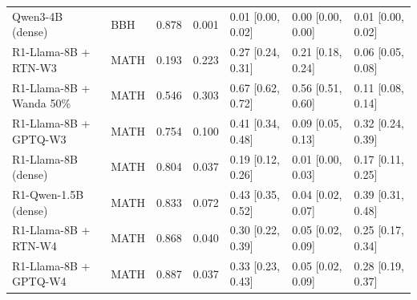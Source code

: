 \begin{tabular}{llrrlll}
Qwen3-4B (dense) & BBH & 0.878 & 0.001 & 0.01 [0.00, 0.02] & 0.00 [0.00, 0.00] & 0.01 [0.00, 0.02] \\
R1-Llama-8B + RTN-W3 & MATH & 0.193 & 0.223 & 0.27 [0.24, 0.31] & 0.21 [0.18, 0.24] & 0.06 [0.05, 0.08] \\
R1-Llama-8B + Wanda 50\% & MATH & 0.546 & 0.303 & 0.67 [0.62, 0.72] & 0.56 [0.51, 0.60] & 0.11 [0.08, 0.14] \\
R1-Llama-8B + GPTQ-W3 & MATH & 0.754 & 0.100 & 0.41 [0.34, 0.48] & 0.09 [0.05, 0.13] & 0.32 [0.24, 0.39] \\
R1-Llama-8B (dense) & MATH & 0.804 & 0.037 & 0.19 [0.12, 0.26] & 0.01 [0.00, 0.03] & 0.17 [0.11, 0.25] \\
R1-Qwen-1.5B (dense) & MATH & 0.833 & 0.072 & 0.43 [0.35, 0.52] & 0.04 [0.02, 0.07] & 0.39 [0.31, 0.48] \\
R1-Llama-8B + RTN-W4 & MATH & 0.868 & 0.040 & 0.30 [0.22, 0.39] & 0.05 [0.02, 0.09] & 0.25 [0.17, 0.34] \\
R1-Llama-8B + GPTQ-W4 & MATH & 0.887 & 0.037 & 0.33 [0.23, 0.43] & 0.05 [0.02, 0.09] & 0.28 [0.19, 0.37] \\
\bottomrule
\end{tabular}
